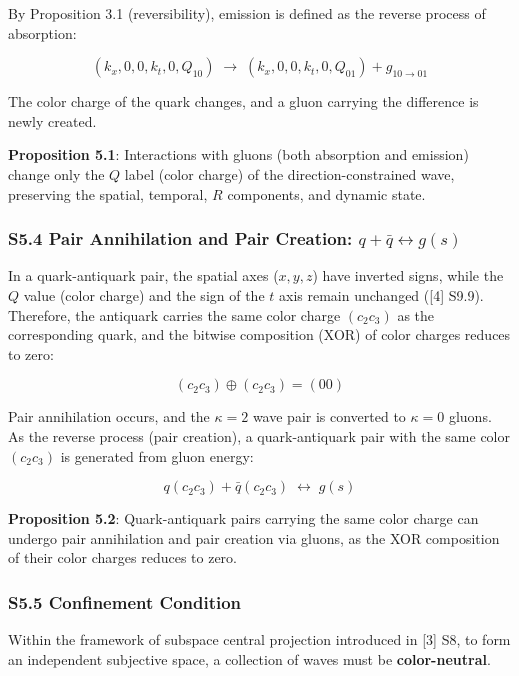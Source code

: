 \documentclass[
  a4paper,11pt]{article}
\theoremstyle{definition}
\theoremstyle{remark}
\begin{document}
By Proposition 3.1 (reversibility), emission is defined as the reverse
process of absorption:

\[(k_x, 0, 0, k_t, 0, Q_{10}) \;\longrightarrow\; (k_x, 0, 0, k_t, 0, Q_{01}) + g_{10 \to 01}\]

The color charge of the quark changes, and a gluon carrying the
difference is newly created.

\textbf{Proposition 5.1}: Interactions with gluons (both absorption and
emission) change only the \(Q\) label (color charge) of the
direction-constrained wave, preserving the spatial, temporal, \(R\)
components, and dynamic state.

\subsubsection{\texorpdfstring{S5.4 Pair Annihilation and Pair Creation:
\(q + \bar{q} \leftrightarrow g(s)\)}{S5.4 Pair Annihilation and Pair Creation: q + \textbackslash bar\{q\} \textbackslash leftrightarrow g(s)}}\label{s5.4-pair-annihilation-and-pair-creation-q-barq-leftrightarrow-gs}

In a quark-antiquark pair, the spatial axes (\(x, y, z\)) have inverted
signs, while the \(Q\) value (color charge) and the sign of the \(t\)
axis remain unchanged ({[}4{]} S9.9). Therefore, the antiquark carries
the same color charge \((c_2 c_3)\) as the corresponding quark, and the
bitwise composition (XOR) of color charges reduces to zero:

\[(c_2 c_3) \oplus (c_2 c_3) = (00)\]

Pair annihilation occurs, and the \(\kappa = 2\) wave pair is converted
to \(\kappa = 0\) gluons. As the reverse process (pair creation), a
quark-antiquark pair with the same color \((c_2 c_3)\) is generated from
gluon energy:

\[q(c_2 c_3) + \bar{q}(c_2 c_3) \;\longleftrightarrow\; g(s)\]

\textbf{Proposition 5.2}: Quark-antiquark pairs carrying the same color
charge can undergo pair annihilation and pair creation via gluons, as
the XOR composition of their color charges reduces to zero.

\subsubsection{S5.5 Confinement
Condition}\label{s5.5-confinement-condition}

Within the framework of subspace central projection introduced in
{[}3{]} S8, to form an independent subjective space, a collection of
waves must be \textbf{color-neutral}.
\end{document}
